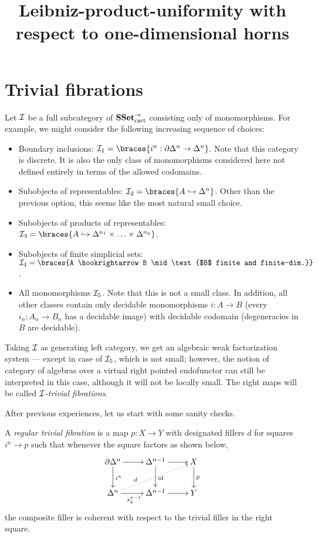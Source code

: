 \documentclass[reqno,10pt,a4paper,oneside]{amsart}
\newcommand{\SSetCart}{\SSet_{\text{cart}}^{\to}}
\begin{document}
\title{Leibniz-product-uniformity with respect to one-dimensional horns}

\maketitle

\section*{Trivial fibrations}

Let $\cal{I}$ be a full subcategory of $\SSetCart$ consisting only of monomorphisms.
For example, we might consider the following increasing sequence of choices:
\begin{itemize}
\item
Boundary inclusions: $\cal{I}_1 = \braces{i^n : \partial \Delta^n \to \Delta^n}$.
Note that this category is discrete.
It is also the only class of monomorphisms considered here not defined entirely in terms of the allowed codomains.
\item
Subobjects of representables: $\cal{I}_2 = \braces{A \hookrightarrow \Delta^n}$.
Other than the previous option, this seems like the most natural small choice.
\item
Subobjects of products of representables: $\cal{I}_3 = \braces{A \hookrightarrow \Delta^{n_1} \times \ldots \times \Delta^{n_k}}$.
\item
Subobjects of finite simplicial sets: $\cal{I}_4 = \braces{A \hookrightarrow B \mid \text{$B$ finite and finite-dim.}}$.
\item
All monomorphisms $\cal{I}_5$.
Note that this is not a small class.
In addition, all other classes contain only decidable monomorphisms $i : A \to B$ (\ie every $i_n : A_n \to B_n$ has a decidable image) with decidable codomain (\ie degeneracies in $B$ are decidable).
\end{itemize}

Taking $\cal{I}$ as generating left category, we get an algebraic weak factorization system --- except in case of $\cal{I}_5$, which is not small; however, the notion of category of algebras over a virtual right pointed endofunctor can still be interpreted in this case, although it will not be locally small.
The right maps will be called \emph{$\cal{I}$-trivial fibrations}.

After previous experiences, let us start with some sanity checks.

\begin{definition}
A \emph{regular trivial fibration} is a map $p : X \to Y$ with designated fillers $d$ for squares $i^n \to p$ such that whenever the square factors as shown below,
\[
\xymatrix{
  \partial \Delta^n
  \ar[r]
  \ar[d]^{i^n}
&
  \Delta^{n-1}
  \ar[r]
  \ar[d]^{\id}
&
  X
  \ar[d]^{p}
\\
  \Delta^n
  \ar[r]_{s_k^{n-1}}
  \ar@{.>}[urr]^(0.3){d}
&
  \Delta^{n-1}
  \ar[r]
&
  Y
}
\]
the composite filler is coherent with respect to the trivial filler in the right square.
\end{definition}
\end{document}
